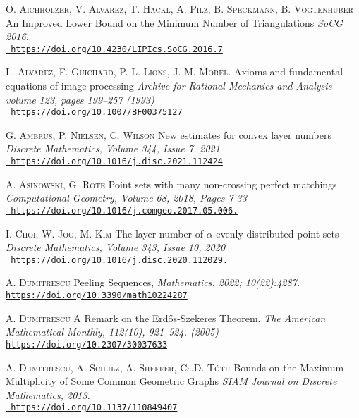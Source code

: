\documentclass[a4paper,UKenglish,cleveref, autoref, thm-restate]{lipics-v2021}
\begin{document}
\begin{thebibliography}{1}

\textsc{O. Aichholzer, V. Alvarez, T. Hackl, A. Pilz, B. Speckmann, B. Vogtenhuber} An Improved Lower Bound on the Minimum Number of Triangulations \textit{SoCG 2016.} \\\href{https://doi.org/10.4230/LIPIcs.SoCG.2016.7}{\tt\small 
https://doi.org/10.4230/LIPIcs.SoCG.2016.7}

\textsc{L. Alvarez, F. Guichard, P. L. Lions, J. M. Morel.} Axioms and fundamental equations of image processing \textit{Archive for Rational Mechanics and Analysis volume 123, pages 199–257 (1993)} \\\href{https://doi.org/10.1007/BF00375127}{\tt\small 
https://doi.org/10.1007/BF00375127}

\textsc{G. Ambrus, P. Nielsen, C. Wilson} New estimates for convex layer numbers \textit{Discrete Mathematics,
Volume 344, Issue 7, 2021} \\\href{https://doi.org/10.1016/j.disc.2021.112424}{\tt\small 
https://doi.org/10.1016/j.disc.2021.112424}

\textsc{A. Asinowski, G. Rote} Point sets with many non-crossing perfect matchings \textit{Computational Geometry, Volume 68, 2018, Pages 7-33} \\\href{https://doi.org/10.1016/j.comgeo.2017.05.006.}{\tt\small 
https://doi.org/10.1016/j.comgeo.2017.05.006.}

\textsc{I. Choi, W. Joo, M. Kim} The layer number of $\alpha$-evenly distributed point sets \textit{Discrete Mathematics, Volume 343, Issue 10, 2020} \\\href{https://doi.org/10.1016/j.disc.2020.112029.}{\tt\small 
https://doi.org/10.1016/j.disc.2020.112029.}

\textsc{A. Dumitrescu} Peeling Sequences, \textit{Mathematics. 2022; 10(22):4287.}\\\href{https://doi.org/10.3390/math10224287}{\tt\small https://doi.org/10.3390/math10224287}

\textsc{A. Dumitrescu} A Remark on the Erdős-Szekeres Theorem. \textit{The American Mathematical Monthly, 112(10), 921–924. (2005)}\\\href{https://doi.org/10.2307/30037633}{\tt\small https://doi.org/10.2307/30037633}

\textsc{A. Dumitrescu, A. Schulz, A. Sheffer, Cs.D. T\'oth} Bounds on the Maximum Multiplicity of Some Common Geometric Graphs \textit{SIAM Journal on Discrete Mathematics, 2013.} \\\href{https://doi.org/10.1137/110849407}{\tt\small 
https://doi.org/10.1137/110849407}


\end{thebibliography}
\end{document}
